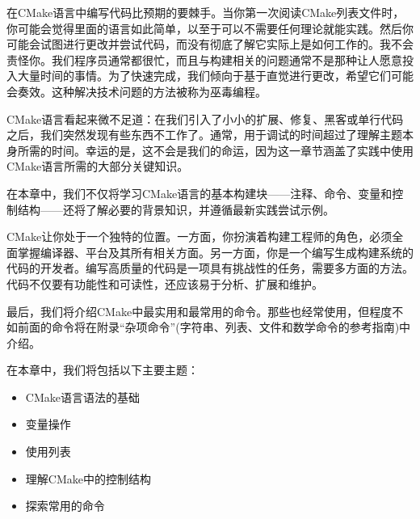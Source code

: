 在CMake语言中编写代码比预期的要棘手。当你第一次阅读CMake列表文件时，你可能会觉得里面的语言如此简单，以至于可以不需要任何理论就能实践。然后你可能会试图进行更改并尝试代码，而没有彻底了解它实际上是如何工作的。我不会责怪你。我们程序员通常都很忙，而且与构建相关的问题通常不是那种让人愿意投入大量时间的事情。为了快速完成，我们倾向于基于直觉进行更改，希望它们可能会奏效。这种解决技术问题的方法被称为巫毒编程。

CMake语言看起来微不足道：在我们引入了小小的扩展、修复、黑客或单行代码之后，我们突然发现有些东西不工作了。通常，用于调试的时间超过了理解主题本身所需的时间。幸运的是，这不会是我们的命运，因为这一章节涵盖了实践中使用CMake语言所需的大部分关键知识。

在本章中，我们不仅将学习CMake语言的基本构建块——注释、命令、变量和控制结构——还将了解必要的背景知识，并遵循最新实践尝试示例。

CMake让你处于一个独特的位置。一方面，你扮演着构建工程师的角色，必须全面掌握编译器、平台及其所有相关方面。另一方面，你是一个编写生成构建系统的代码的开发者。编写高质量的代码是一项具有挑战性的任务，需要多方面的方法。代码不仅要有功能性和可读性，还应该易于分析、扩展和维护。

最后，我们将介绍CMake中最实用和最常用的命令。那些也经常使用，但程度不如前面的命令将在附录“杂项命令”(字符串、列表、文件和数学命令的参考指南)中介绍。

在本章中，我们将包括以下主要主题：

\begin{itemize}
\item
CMake语言语法的基础

\item
变量操作

\item
使用列表

\item
理解CMake中的控制结构

\item
探索常用的命令
\end{itemize}


































